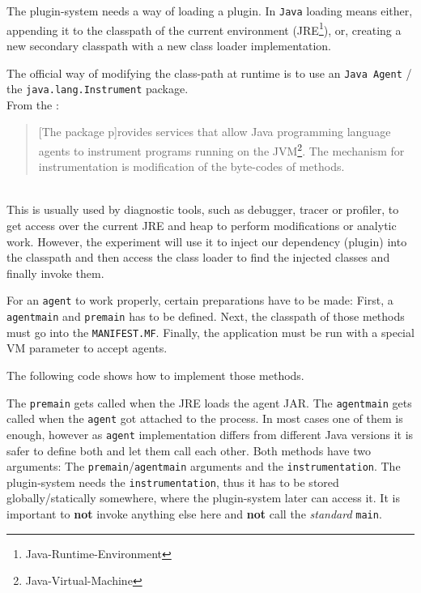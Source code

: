 The plugin-system needs a way of loading a plugin.
In \texttt{Java} loading means either, appending it to the classpath of the current environment (JRE\footnote{Java-Runtime-Environment}), or, creating a new secondary classpath with a new class loader implementation.

The official way of modifying the class-path at runtime is to use an \texttt{Java Agent} / the \texttt{java.lang.Instrument} package. \\
From the \textcite{javadoc:instrument}:
\begin{quote}
    [The package p]rovides services that allow Java programming language agents to instrument programs running on the JVM\footnote{Java-Virtual-Machine}.\newline
    The mechanism for instrumentation is modification of the byte-codes of methods.
\end{quote}~\parencite{javadoc:instrument}\\
This is usually used by diagnostic tools, such as debugger, tracer or profiler, to get access over the current JRE and heap to perform modifications or analytic work.
However, the experiment will use it to inject our dependency (plugin) into the classpath and then access the class loader to find the injected classes and finally invoke them.

For an \texttt{agent} to work properly, certain preparations have to be made:
First, a \lstinline{agentmain} and \lstinline{premain} has to be defined.
Next, the classpath of those methods must go into the \texttt{MANIFEST.MF}.
Finally, the application must be run with a special VM parameter to accept agents.

The following code shows how to implement those methods.

The \lstinline{premain} gets called when the JRE loads the agent JAR.
The \lstinline{agentmain} gets called when the \texttt{agent} got attached to the process.
In most cases one of them is enough, however as \texttt{agent} implementation differs from different Java versions it is safer to define both and let them call each other.
Both methods have two arguments: 
The \lstinline{premain}/\lstinline{agentmain} arguments and the \lstinline{instrumentation}.
The plugin-system needs the \lstinline{instrumentation}, thus it has to be stored globally/statically somewhere, where the plugin-system later can access it.
It is important to \textbf{not} invoke anything else here and \textbf{not} call the \textit{standard} \lstinline{main}.

